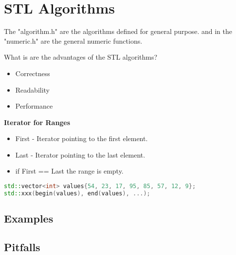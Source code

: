 \section{STL Algorithms}
The "algorithm.h" are the algorithms defined for general purpose. and in the "numeric.h" are the general numeric functions.

What is are the advantages of the STL algorithms?
\begin{itemize}
	\itemsep -0.5em 
	\item Correctness
	\item Readability
	\item Performance
\end{itemize}

\textbf{Iterator for Ranges}
\begin{itemize}
  \itemsep 0em 
  \item First - Iterator pointing to the first element.
  \item Last - Iterator pointing to the last element.
  \item if First == Last the range is empty.
\end{itemize}

\begin{lstlisting}[language=C++]
std::vector<int> values{54, 23, 17, 95, 85, 57, 12, 9}; 
std::xxx(begin(values), end(values), ...);
\end{lstlisting}

\subsection{Examples}

\subsection{Pitfalls}

\pagebreak